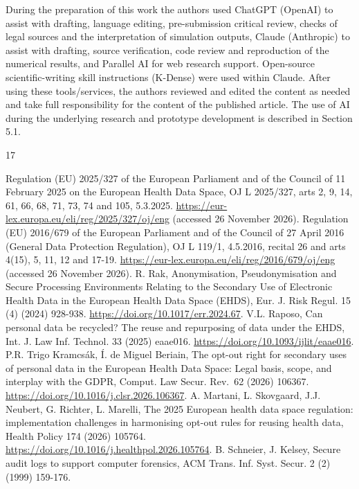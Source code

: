 \documentclass[5p,twocolumn]{elsarticle}
\begin{document}
During the preparation of this work the authors used ChatGPT (OpenAI) to
assist with drafting, language editing, pre-submission critical review,
checks of legal sources and the interpretation of simulation outputs,
Claude (Anthropic) to assist with drafting, source verification, code
review and reproduction of the numerical results, and Parallel AI for
web research support. Open-source scientific-writing skill instructions
(K-Dense) were used within Claude. After using these tools/services, the
authors reviewed and edited the content as needed and take full
responsibility for the content of the published article. The use of AI
during the underlying research and prototype development is described in
Section 5.1.

\begin{thebibliography}{17}
\setlength{\itemsep}{1pt}
\raggedright
{} Regulation (EU) 2025/327 of the European Parliament and of the
Council of 11 February 2025 on the European Health Data Space, OJ L
2025/327, arts 2, 9, 14, 61, 66, 68, 71, 73, 74 and 105, 5.3.2025.
\url{https://eur-lex.europa.eu/eli/reg/2025/327/oj/eng} (accessed 26
November 2026).
 Regulation (EU) 2016/679 of the European Parliament and of the
Council of 27 April 2016 (General Data Protection Regulation), OJ L
119/1, 4.5.2016, recital 26 and arts 4(15), 5, 11, 12 and 17-19.
\url{https://eur-lex.europa.eu/eli/reg/2016/679/oj/eng} (accessed 26
November 2026).
 R. Rak, Anonymisation, Pseudonymisation and Secure Processing
Environments Relating to the Secondary Use of Electronic Health Data in
the European Health Data Space (EHDS), Eur. J. Risk Regul. 15 (4) (2024)
928-938. \url{https://doi.org/10.1017/err.2024.67}.
 V.L. Raposo, Can personal data be recycled? The reuse and
repurposing of data under the EHDS, Int. J. Law Inf. Technol. 33 (2025)
eaae016. \url{https://doi.org/10.1093/ijlit/eaae016}.
 P.R. Trigo Kramcsák, Í. de Miguel Beriain, The opt-out right for
secondary uses of personal data in the European Health Data Space: Legal
basis, scope, and interplay with the GDPR, Comput. Law Secur. Rev.~62
(2026) 106367. \url{https://doi.org/10.1016/j.clsr.2026.106367}.
 A. Martani, L. Skovgaard, J.J. Neubert, G. Richter, L. Marelli,
The 2025 European health data space regulation: implementation
challenges in harmonising opt-out rules for reusing health data, Health
Policy 174 (2026) 105764.
\url{https://doi.org/10.1016/j.healthpol.2026.105764}.
 B. Schneier, J. Kelsey, Secure audit logs to support computer
forensics, ACM Trans. Inf. Syst. Secur. 2 (2) (1999) 159-176.

\end{thebibliography}
\end{document}
